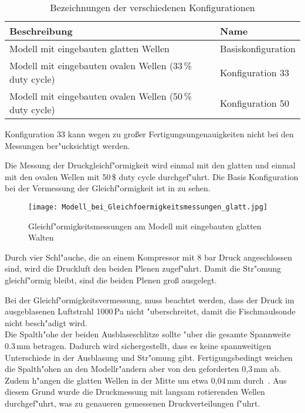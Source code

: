 \begin{table}[h]
	\centering
	\begin{tabular}{ll}
		\toprule
		Beschreibung & Name\\
		\midrule
		Modell mit eingebauten glatten Wellen & Basiskonfiguration\\
		Modell mit eingebauten ovalen Wellen (33\,\% duty cycle) & Konfiguration 33\\
		Modell mit eingebauten ovalen Wellen (50\,\% duty cycle) & Konfiguration 50\\
		\bottomrule
	\end{tabular}
	\caption{Bezeichnungen der verschiedenen Konfigurationen}
	\label{tab:zuordnung}
\end{table}
Konfiguration 33 kann wegen zu gro\ss{}er Fertigungsungenauigkeiten nicht bei den Messungen ber"ucksichtigt werden.

Die Messung der Druckgleichf"ormigkeit wird einmal mit den glatten und einmal mit den ovalen Wellen mit 50\,\$ duty cycle durchgef"uhrt. Die Basis Konfiguration bei der Vermessung der Gleichf"ormigkeit ist in   zu sehen.

\begin{figure}[h]
	\centering
	\texttt{[image: Modell\_bei\_Gleichfoermigkeitsmessungen\_glatt.jpg]}
	\caption{Gleichf"ormigkeitsmessungen am Modell mit eingebauten glatten Walten}
	\label{fig:Modell_bei_Gleichf"ormigkeitsmessungen}
\end{figure}

Durch vier Schl"auche, die an einem Kompressor mit 8 bar Druck angeschlossen sind, wird die Druckluft den beiden Plenen zugef"uhrt. Damit die Str"omung gleichf"ormig bleibt, sind die beiden Plenen gro\ss{} ausgelegt. 

Bei der Gleichf"ormigkeitsvermessung, muss beachtet werden, dass der Druck im ausgeblasenen Luftstrahl 1000\,Pa nicht "uberschreitet, damit die Fischmaulsonde nicht besch"adigt wird.\\
Die Spalth"ohe der beiden Ausblaseschlitze sollte "uber die gesamte Spannweite 0.3\,mm betragen. Dadurch wird sichergestellt, dass es keine spannweitigen Unterschiede in der Ausblasung und Str"omung gibt.
Fertigungsbedingt weichen die Spalth"ohen an den Modellr"andern aber von den geforderten 0,3\,mm ab. Zudem h"angen die glatten Wellen in der Mitte um etwa 0,04\,mm durch~\cite{Bilges.2018}. Aus diesem Grund wurde die Druckmessung mit langsam rotierenden Wellen durchgef"uhrt, was zu genaueren gemessenen Druckverteilungen f"uhrt.

